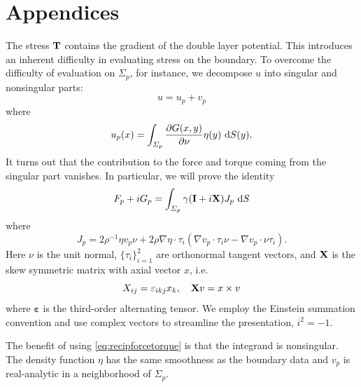 \documentclass[lineno]{jfm}
\begin{document}
\appendix

\section{Appendices}
The stress ${\bf T}$ contains the gradient of the double layer potential. This 
introduces an inherent difficulty in evaluating stress on the boundary.
To overcome the difficulty of evaluation on $\Sigma_p$, for instance, we decompose $u$ into singular and nonsingular parts:
\begin{equation}
u = u_p + v_p
\end{equation}
where  
\begin{equation}
u_p(x) = \int_{\Sigma_p} \frac{\partial G(x,y)}{\partial \nu} \eta(y) \,\dif S(y).
\end{equation}
It turns out that the contribution to the force and torque coming from the singular
part vanishes. In particular, we will prove the identity
\begin{equation}
\label{eq:recipforcetorque}
F_p + iG_p= \int_{\Sigma_p} \gamma ({\bf I}+i{\bf X})J_{p} \,\dif S
\end{equation}
where
 \begin{equation}
\label{eq:jumpstress1}
J_{p} = 2\rho^{-1} \eta  v_p \nu 
+ 2\rho \nabla \eta \cdot \tau_i(\nabla v_p \cdot \tau_i \nu -  \nabla v_p \cdot \nu \tau_i).
\end{equation}
Here $\nu$ is the unit normal, $\{\tau_i\}_{i=1}^2$ are orthonormal tangent vectors,
and ${\bf X}$ is the skew symmetric matrix with axial vector $x$, i.e.
\[X_{ij} = \varepsilon_{ikj}x_k,\quad {\bf X}v = x\times v\]
where $\boldsymbol{\varepsilon}$ is the third-order alternating tensor.
We employ the Einstein summation convention and use complex vectors to streamline the presentation, $i^2 = -1$.

The benefit of using \eqref{eq:recipforcetorque} is that the integrand  is nonsingular.
The density function $\eta$ has the same smoothness as the boundary data
and $v_p$ is real-analytic in a neighborhood of $\Sigma_p$.
\end{document}
